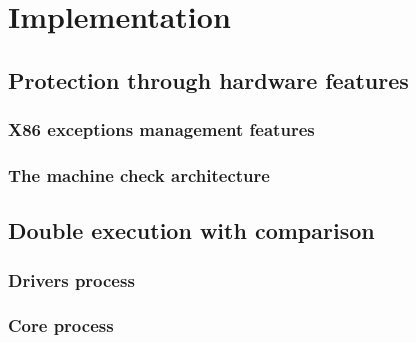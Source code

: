 \addchapheadtotoc
\chapter{Implementation}
\section{Protection through hardware features}
\subsection{X86 exceptions management features }
\subsection{The machine check architecture}
\section{Double execution with comparison}
\subsection{Drivers process}
\subsection{Core process}